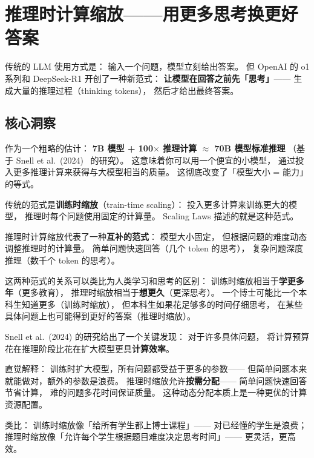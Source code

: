 \chapter{推理时计算缩放——用更多思考换更好答案}
\label{ch:ttc}

传统的 LLM 使用方式是：
输入一个问题，模型立刻给出答案。
但 OpenAI 的 o1 系列和 DeepSeek-R1 开创了一种新范式：
\textbf{让模型在回答之前先「思考」}——
生成大量的推理过程（thinking tokens），
然后才给出最终答案。

\section{核心洞察}

\begin{corebox}[推理时计算的颠覆性影响]
作为一个粗略的估计：
\textbf{7B 模型 + 100$\times$ 推理计算 $\approx$ 70B 模型标准推理}
（基于 Snell et al.\ (2024)~\cite{snell2024scaling} 的研究）。
这意味着你可以用一个便宜的小模型，
通过投入更多推理计算来获得与大模型相当的质量。
这彻底改变了「模型大小 = 能力」的等式。
\end{corebox}

传统的范式是\textbf{训练时缩放}（train-time scaling）：
投入更多计算来训练更大的模型，
推理时每个问题使用固定的计算量。
Scaling Laws 描述的就是这种范式。

推理时计算缩放代表了一种\textbf{互补的范式}：
模型大小固定，
但根据问题的难度动态调整推理时的计算量。
简单问题快速回答（几个 token 的思考），
复杂问题深度推理（数千个 token 的思考）。

这两种范式的关系可以类比为人类学习和思考的区别：
训练时缩放相当于\textbf{学更多年}（更多教育），
推理时缩放相当于\textbf{想更久}（更深思考）。
一个博士可能比一个本科生知道更多（训练时缩放），
但本科生如果花足够多的时间仔细思考，
在某些具体问题上也可能得到更好的答案（推理时缩放）。

\begin{whybox}[为什么推理时缩放可能比训练时缩放更高效？]
Snell et al.\ (2024) 的研究给出了一个关键发现：
对于许多具体问题，
将计算预算花在推理阶段比花在扩大模型更具\textbf{计算效率}。

直觉解释：
训练时扩大模型，所有问题都受益于更多的参数——
但简单问题本来就能做对，额外的参数是浪费。
推理时缩放允许\textbf{按需分配}——
简单问题快速回答节省计算，
难的问题多花时间保证质量。
这种动态分配本质上是一种更优的计算资源配置。

类比：
训练时缩放像「给所有学生都上博士课程」——
对已经懂的学生是浪费；
推理时缩放像「允许每个学生根据题目难度决定思考时间」——
更灵活，更高效。
\end{whybox}


